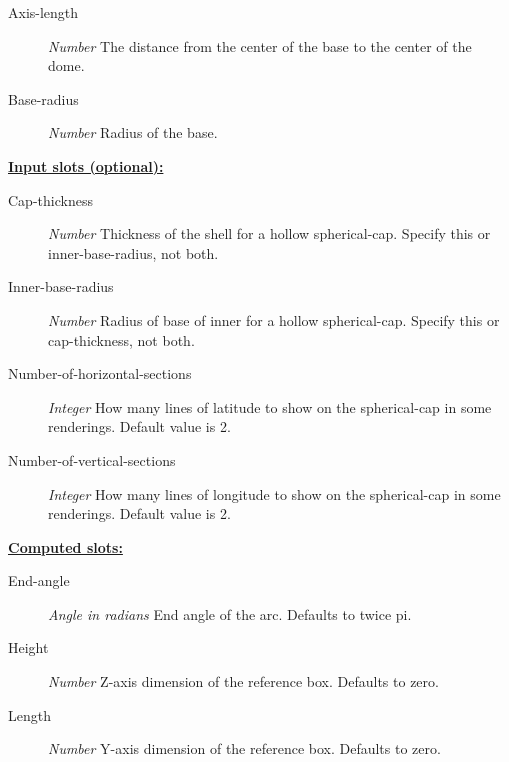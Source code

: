 \documentclass [11pt]{book}
\begin{document}
\begin{itemize}
\begin{description}
\item [Axis-length]
\emph{Number} The distance from the center of the base to the center of the dome.


\item [Base-radius]
\emph{Number} Radius of the base.


\end{description}






\textbf{
\underline{Input slots (optional):}}

\begin{description}

\item [Cap-thickness]
\emph{Number} Thickness of the shell for a hollow spherical-cap. Specify this
or inner-base-radius, not both.


\item [Inner-base-radius]
\emph{Number} Radius of base of inner for a hollow spherical-cap. Specify this
or cap-thickness, not both.


\item [Number-of-horizontal-sections]
\emph{Integer} How many lines of latitude to show on the spherical-cap in some renderings. Default value is 2.


\item [Number-of-vertical-sections]
\emph{Integer} How many lines of longitude to show on the spherical-cap in some renderings. Default value is 2.


\end{description}






\textbf{
\underline{Computed slots:}}

\begin{description}

\item [End-angle]
\emph{Angle in radians} End angle of the arc. Defaults to twice pi.


\item [Height]
\emph{Number} Z-axis dimension of the reference box. Defaults to zero.


\item [Length]
\emph{Number} Y-axis dimension of the reference box. Defaults to zero.



\end{description}
\end{itemize}
\end{document}
